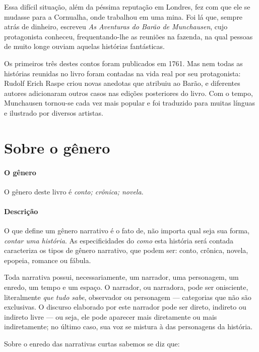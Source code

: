 \documentclass[11pt]{extarticle}
\begin{document}
Essa difícil situação, além da péssima reputação em Londres, fez com que ele se mudasse para a Cornualha, onde trabalhou em uma mina. Foi lá que, sempre atrás de dinheiro, escreveu \textit{As Aventuras do Barão de Munchausen}, cujo protagonista conheceu, frequentando-lhe as reuniões na fazenda, na qual pessoas de muito longe ouviam aquelas histórias fantásticas. 

Os primeiros três destes contos foram publicados em 1761. Mas nem todas as histórias reunidas no livro foram contadas na vida real por seu protagonista: Rudolf Erich Raspe criou novas anedotas que atribuiu ao Barão, e diferentes autores adicionaram outros casos nas edições posteriores do livro. Com o tempo, Munchausen tornou-se cada vez mais popular e foi traduzido para muitas línguas e ilustrado por diversos artistas.


\section{Sobre o gênero}

\paragraph{O gênero} O gênero deste livro é \textit{conto; crônica; novela}.

\paragraph{Descrição} O que define um gênero narrativo é o fato de, não importa qual seja sua forma, \textit{contar uma história}.
As especificidades do \textit{como} esta história será contada caracteriza os tipos de gênero narrativo, que podem ser: conto, crônica, novela, epopeia, romance ou fábula. 

Toda narrativa possui, necessariamente, um narrador, uma personagem, um enredo, um tempo e um espaço. O narrador, ou narradora, pode ser onisciente, literalmente \textit{que tudo sabe}, observador ou personagem --- categorias que não são exclusivas. O discurso elaborado por este narrador pode ser direto, indireto ou indireto livre --- ou seja, ele pode aparecer mais diretamente ou mais indiretamente; no último caso, sua voz se mistura à das personagens da história.

Sobre o enredo das narrativas curtas sabemos se diz que:
\end{document}
